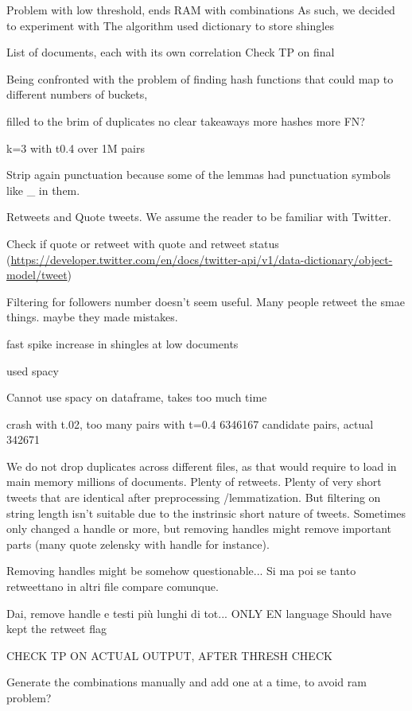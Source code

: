 \documentclass[runningheads]{llncs}
\begin{document}
Problem with low threshold, ends RAM with combinations
As such, we decided to experiment with   
The algorithm 
used dictionary to store shingles 

List of documents, each with its own correlation
Check TP on final


Being confronted with the problem of finding hash functions that could map to different numbers of buckets,

filled to the brim of duplicates
no clear takeaways
more hashes more FN?

k=3 with t0.4 over 1M pairs

Strip again punctuation because some of the lemmas had punctuation symbols like \_ in them.

Retweets and Quote tweets. We assume the reader to be familiar with Twitter.

Check if quote or retweet with quote and retweet status (\url{https://developer.twitter.com/en/docs/twitter-api/v1/data-dictionary/object-model/tweet})

Filtering for followers number doesn't seem useful. Many people retweet the smae things. maybe they made mistakes.

fast spike increase in shingles at low documents

used spacy 

Cannot use spacy on dataframe, takes too much time

crash with t.02, too many pairs
with t=0.4 6346167 candidate pairs, actual 342671 

We do not drop duplicates across different files, as that would require to load in main memory millions of documents. Plenty of retweets. Plenty of very short tweets that are identical after preprocessing /lemmatization. But filtering on string length isn't suitable due to the instrinsic short nature of tweets.  
Sometimes only changed a handle or more, but removing handles might remove important parts (many quote zelensky with handle for instance).

Removing handles might be somehow questionable... Si ma poi se tanto retweettano in altri file compare comunque.

Dai, remove handle e testi più lunghi di tot...
ONLY EN language
Should have kept the retweet flag


CHECK TP ON ACTUAL OUTPUT, AFTER THRESH CHECK

Generate the combinations manually and add one at a time, to avoid ram problem?



\end{document}
